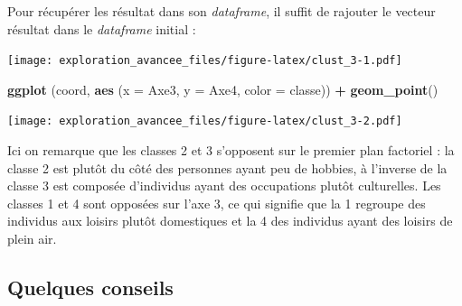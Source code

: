 \documentclass[]{book}
\newenvironment{Shaded}{\begin{snugshade}}{\end{snugshade}}
\newcommand{\DataTypeTok}[1]{\textcolor[rgb]{0.13,0.29,0.53}{#1}}
\newcommand{\DecValTok}[1]{\textcolor[rgb]{0.00,0.00,0.81}{#1}}
\newcommand{\KeywordTok}[1]{\textcolor[rgb]{0.13,0.29,0.53}{\textbf{#1}}}
\newcommand{\NormalTok}[1]{#1}
\newcommand{\OperatorTok}[1]{\textcolor[rgb]{0.81,0.36,0.00}{\textbf{#1}}}
\newcommand{\StringTok}[1]{\textcolor[rgb]{0.31,0.60,0.02}{#1}}
\begin{document}
Pour récupérer les résultat dans son \emph{dataframe}, il suffit de rajouter le vecteur résultat dans le \emph{dataframe} initial :

\begin{Shaded}
\end{Shaded}

\texttt{[image: exploration\_avancee\_files/figure-latex/clust\_3-1.pdf]}

\begin{Shaded}
\begin{Highlighting}[]
\KeywordTok{ggplot}\NormalTok{ (coord, }\KeywordTok{aes}\NormalTok{ (}\DataTypeTok{x =}\NormalTok{ Axe3, }\DataTypeTok{y =}\NormalTok{ Axe4, }\DataTypeTok{color =}\NormalTok{ classe)) }\OperatorTok{+}
\StringTok{  }\KeywordTok{geom_point}\NormalTok{()}
\end{Highlighting}
\end{Shaded}

\texttt{[image: exploration\_avancee\_files/figure-latex/clust\_3-2.pdf]}

Ici on remarque que les classes 2 et 3 s'opposent sur le premier plan factoriel : la classe 2 est plutôt du côté des personnes ayant peu de hobbies, à l'inverse de la classe 3 est composée d'individus ayant des occupations plutôt culturelles.
Les classes 1 et 4 sont opposées sur l'axe 3, ce qui signifie que la 1 regroupe des individus aux loisirs plutôt domestiques et la 4 des individus ayant des loisirs de plein air.

\hypertarget{quelques-conseils}{%
\subsection{Quelques conseils}\label{quelques-conseils}}
\end{document}

